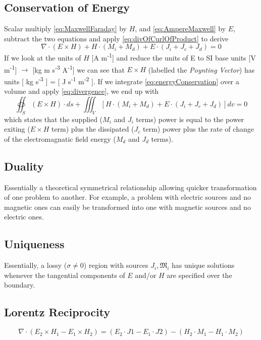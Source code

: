 \documentclass{article}
\numberwithin{equation}{section}
\begin{document}
\subsection{Conservation of Energy}
Scalar multiply \eqref{eq:MaxwellFaraday} by $H$, and \eqref{eq:AmpereMaxwell} by $E$, subtract the two equations and apply \eqref{eq:divOfCurlOfProduct} to derive
\begin{equation} \label{eq:energyConservation}
    \nabla \cdot ( E \times H) + H \cdot ( M_i + M_d ) + E \cdot ( J_i + J_c + J_d ) = 0
\end{equation}
If we look at the units of $H$ [A m\textsuperscript{-1}] and reduce the units of E to SI base units [V m\textsuperscript{-1}] $\to$ [kg m s\textsuperscript{-3} A\textsuperscript{-1}] we can see that $E \times H$ (labelled the \emph{Poynting Vector}) has units [ kg s\textsuperscript{-3} ] = [ J s\textsuperscript{-1} m\textsuperscript{-2} ]. If we integrate \eqref{eq:energyConservation} over a volume and apply \eqref{eq:divergence}, we end up with
\begin{equation} \label{eq:energyConservationIntegral}
    \oiint_S ( E \times H) \cdot ds + \iiint_V [ H \cdot ( M_i + M_d ) + E \cdot ( J_i + J_c + J_d )] dv = 0
\end{equation}
which states that the supplied ($M_i$ and $J_i$ terms) power is equal to the power exiting ($E \times H$ term) plus the dissipated ($J_c$ term) power plus the rate of change of the electromagnatic field energy ($M_d$ and $J_d$ terms).
\subsection{Duality}
    Essentially a theoretical symmetrical relationship allowing quicker transformation of one problem to another. For example, a problem with electric sources and no magnetic ones can easily be transformed into one with magnetic sources and no electric ones.
\subsection{Uniqueness}
    Essentially, a lossy ($\sigma \neq 0$) region with sources $J_i, \mathfrak{M}_i$ has unique solutions whenever the tangential components of $E$ and/or $H$ are specified over the boundary.
\subsection{Lorentz Reciprocity}
\begin{equation}
    \label{eq:lorentzReciprocity}
    \nabla \cdot( E_2 \times H_1 - E_1 \times H_2 ) = ( E_2 \cdot J1 - E_1 \cdot J2 ) - ( H_2 \cdot M_1 - H_1 \cdot M_2 )
\end{equation}
\end{document}
